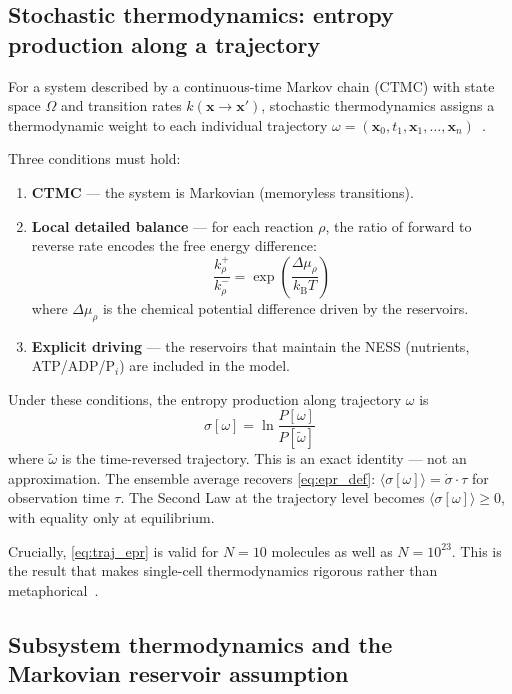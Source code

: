 \documentclass[11pt,a4paper]{article}
\newcommand{\kB}{k_{\mathrm{B}}}
\newcommand{\EPR}{\dot{\sigma}}
\newcommand{\TrajEPR}[1]{\sigma[#1]}
\newcommand{\trev}[1]{\tilde{#1}}
\begin{document}
\subsection{Stochastic thermodynamics: entropy production along a trajectory}

For a system described by a continuous-time Markov chain (CTMC) with
state space $\Omega$ and transition rates $k(\mathbf{x} \to \mathbf{x}')$,
stochastic thermodynamics assigns a thermodynamic weight to each
individual trajectory $\omega = (\mathbf{x}_0, t_1, \mathbf{x}_1, \ldots,
\mathbf{x}_n)$~\cite{Seifert2005,Seifert2012}.

Three conditions must hold:
\begin{enumerate}
  \item \textbf{CTMC} --- the system is Markovian (memoryless transitions).
  \item \textbf{Local detailed balance} --- for each reaction $\rho$,
    the ratio of forward to reverse rate encodes the free energy difference:
    \begin{equation}
      \frac{k^+_\rho}{k^-_\rho} = \exp\!\left(\frac{\Delta\mu_\rho}{\kB T}\right)
      \label{eq:ldb}
    \end{equation}
    where $\Delta\mu_\rho$ is the chemical potential difference driven by
    the reservoirs.
  \item \textbf{Explicit driving} --- the reservoirs that maintain the
    NESS (nutrients, ATP/ADP/P$_i$) are included in the model.
\end{enumerate}

Under these conditions, the entropy production along trajectory $\omega$
is
\begin{equation}
  \TrajEPR{\omega} = \ln \frac{P[\omega]}{P[\trev\omega]}
  \label{eq:traj_epr}
\end{equation}
where $\trev\omega$ is the time-reversed trajectory.
This is an exact identity --- not an approximation.
The ensemble average recovers \cref{eq:epr_def}: $\langle \TrajEPR{\omega}
\rangle = \EPR \cdot \tau$ for observation time $\tau$.
The Second Law at the trajectory level becomes $\langle \TrajEPR{\omega}
\rangle \geq 0$, with equality only at equilibrium.

Crucially, \cref{eq:traj_epr} is valid for $N = 10$ molecules as well as
$N = 10^{23}$.
This is the result that makes single-cell thermodynamics rigorous rather
than metaphorical~\cite{Liphardt2002,Wang2002}.

\subsection{Subsystem thermodynamics and the Markovian reservoir assumption}
\label{sec:subsystem}
\end{document}
